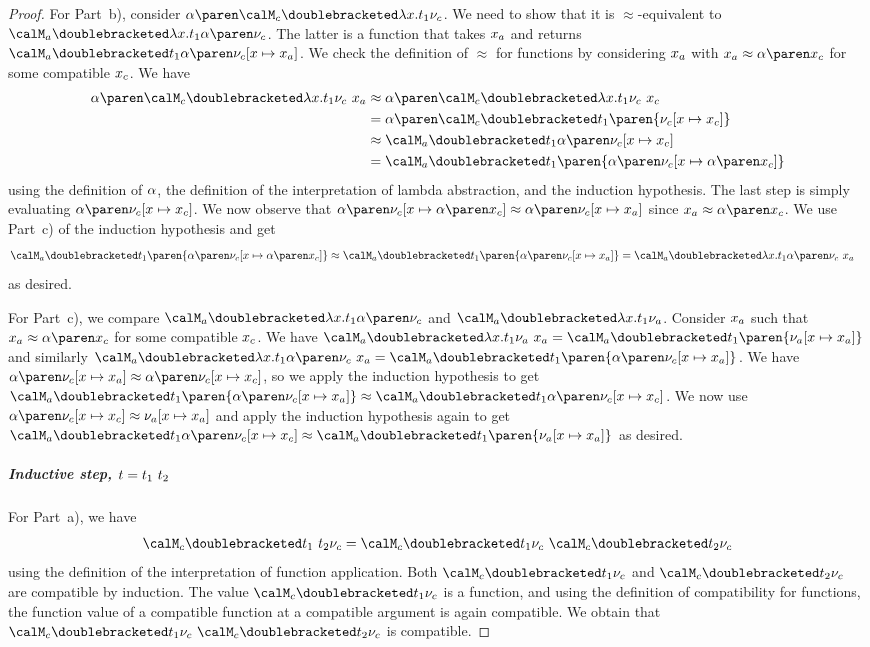 \documentclass[../../diss.tex]{subfiles}
\begin{document}
\begin{proof}
    For Part~b), consider $\abs{\semc{\lambda x . t_1}{\valc}}$.
    We need to show that it is $\approx$-equivalent to $\sema{\lambda x . t_1}{\abs{\valc}}$.
    The latter is a function that takes $x_a$ and returns $\sema{t_1}{\abs{\valc}[x \mapsto \xa]}$.
    We check the definition of $\approx$ for functions by considering $x_a$ with $\xa \approx \abs{\xc}$ for some compatible $x_c$.
    We have
    \begin{align*}
        \abs{\semc{\lambda x . t_1}{\valc}} \appl \xa
        &\approx \abs{\semc{\lambda x . t_1}{\valc} \appl \xc}
        \\
        &= \abs{\semc{t_1}{\paren{\valc [x \mapsto \xc]}}}
        \\
        &\approx \sema{t_1}{\abs{\valc [x \mapsto \xc]}}
        \\
        &= \sema{t_1}{\paren{\abs{\valc} [x \mapsto \abs{\xc}]}}
    \end{align*}
    using the definition of $\abs$, the definition of the interpretation of lambda abstraction, and the induction hypothesis.
    The last step is simply evaluating $\abs{\valc [x \mapsto \xc]}$.
    We now observe that $\abs{\valc}[x \mapsto \abs{\xc}] \approx \abs{\valc}[x \mapsto \xa]$ since $\xa \approx \abs{\xc}$.
    We use Part~c) of the induction hypothesis and get
    \begin{align*}
       \sema{t_1}{\paren{\abs{\valc} [x \mapsto \abs{\xc}]}}
       &\approx  \sema{t_1}{\paren{\abs{\valc} [x \mapsto \xa]}}
       = \sema{\lambda x. t_1}{\abs{\valc}} \appl \xa
    \end{align*}
    as desired.

    For Part~c), we compare $\sema{\lambda x . t_1}{\abs{\valc}}$ and $\sema{\lambda x . t_1}{\vala}$.
    Consider $x_a$ such that $\xa \approx \abs{\xc}$ for some compatible $x_c$.
    We have $\sema{\lambda x .  t_1}{\vala} \appl \xa = \sema{t_1}{\paren{\vala[x \mapsto \xa]}}$
    and similarly $\sema{\lambda x .  t_1}{\abs{\valc}} \appl \xa = \sema{t_1}{\paren{\abs{\valc}[x \mapsto \xa]}}$.
    We have $\abs{\valc}[x \mapsto \xa] \approx \abs{\valc[x \mapsto \xc]}$, so we apply the induction hypothesis to get
    $\sema{t_1}{\paren{\abs{\valc}[x \mapsto \xa]}} \approx \sema{t_1}{\abs{\valc[x \mapsto \xc]}}$.
    We now use $\abs{\valc[x \mapsto \xc]} \approx \vala[x \mapsto \xa]$ and apply the induction hypothesis again to get
    $\sema{t_1}{\abs{\valc[x \mapsto \xc]}} \approx \sema{t_1}{\paren{\vala[x \mapsto \xa]}}$ as desired.

    \subparagraph{Inductive step, $t = t_1 \  t_2$}
    For Part~a), we have
    \[
        \semc{t_1 \appl t_2}{\valc} = \semc{t_1}{\valc} \appl \semc{t_2}{\valc}
    \]
    using the definition of the interpretation of function application.
    Both $\semc{t_1}{\valc}$ and $\semc{t_2}{\valc}$ are compatible by induction.
    The value $\semc{t_1}{\valc}$ is a function, and using the definition of compatibility for functions, the function value of a compatible function at a compatible argument is again compatible.
    We obtain that $\semc{t_1}{\valc} \appl \semc{t_2}{\valc}$ is compatible.


\end{proof}
\end{document}
